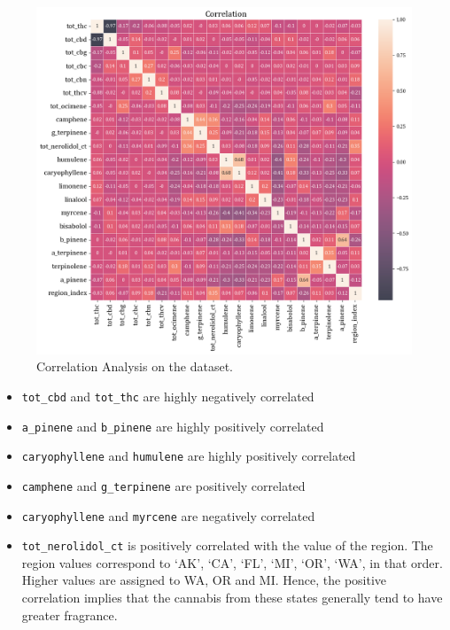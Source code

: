 \documentclass[11pt,a4paper]{article}
\begin{document}
\begin{figure}[H]
	\centering
	\includegraphics[scale=0.5]{images/corr.png}
	\caption{Correlation Analysis on the dataset.}
	\label{fig:corr_plot}
\end{figure}

\begin{itemize}
	\itemsep0em
	\item \texttt{tot\_cbd} and \texttt{tot\_thc} are highly negatively correlated
	\item \texttt{a\_pinene} and \texttt{b\_pinene} are highly positively correlated
	\item \texttt{caryophyllene} and \texttt{humulene} are highly positively correlated
	\item \texttt{camphene} and \texttt{g\_terpinene} are positively correlated
	\item \texttt{caryophyllene} and \texttt{myrcene} are negatively correlated
	\item \texttt{tot\_nerolidol\_ct} is positively correlated with the value of the region. The region values correspond to `AK', `CA', `FL', `MI', `OR', `WA', in that order. Higher values are assigned to WA, OR and MI. Hence, the positive correlation implies that the cannabis from these states generally tend to have greater fragrance.

\end{itemize}
% 
\end{document}
